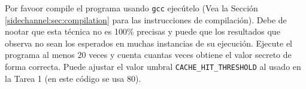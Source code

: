 Por favoor compile el programa usando \texttt{gcc} ejecútelo (Vea la Sección \ref{sidechannel:sec:compilation} para las instrucciones de compilación).
Debe de nootar que esta técnica no es 100\% precisas y puede que los resultados que observa no sean los esperados en muchas instancias de su ejecución.
Ejecute el programa al menos 20 veces y cuenta cuantas veces obtiene el valor secreto de forma correcta. Puede ajustar el valor umbral \texttt{CACHE\_HIT\_THRESHOLD} al usado en la Tarea 1 (en este código se usa 80).

